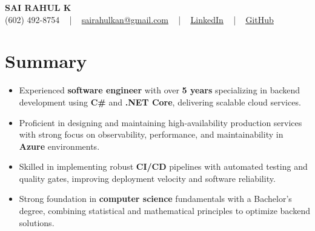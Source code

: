 \documentclass[letterpaper,11pt]{article}
\newcommand{\resumeItem}[1]{
  \item\footnotesize{
    {#1 \vspace{-2pt}}
  }
}
\newcommand{\resumeItemListStart}{\begin{itemize}[leftmargin=*]}
\newcommand{\resumeItemListEnd}{\end{itemize}\vspace{-5pt}}
\begin{document}
\begin{center}
    {\fontsize{14pt}{12pt}\selectfont \textbf{\MakeUppercase{Sai Rahul K}}}\\ \vspace{2pt}
    \fontsize{10pt}{12pt}\selectfont (602) 492-8754 ~ | ~ \href{mailto:sairahulkan@gmail.com}{sairahulkan@gmail.com} ~ | ~
    \href{https://www.linkedin.com/in/rq123/}{\color{blue}\underline{LinkedIn}} ~ | ~
    \href{https://github.com/kanrahuldo}{\color{blue}\underline{GitHub}}~
    \vspace{-8pt}
\end{center}

\section{Summary}
\fontsize{9pt}{10pt}\selectfont
\resumeItemListStart
    \resumeItem{Experienced \textbf{software engineer} with over \textbf{5 years} specializing in backend development using \textbf{C\#} and \textbf{.NET Core}, delivering scalable cloud services.} \vspace{-3pt}
    \resumeItem{Proficient in designing and maintaining high-availability production services with strong focus on observability, performance, and maintainability in \textbf{Azure} environments.} \vspace{-3pt}
    \resumeItem{Skilled in implementing robust \textbf{CI/CD} pipelines with automated testing and quality gates, improving deployment velocity and software reliability.} \vspace{-3pt}
    \resumeItem{Strong foundation in \textbf{computer science} fundamentals with a Bachelor’s degree, combining statistical and mathematical principles to optimize backend solutions.} \vspace{-3pt}
\resumeItemListEnd
\vspace{-6pt}
\end{document}
